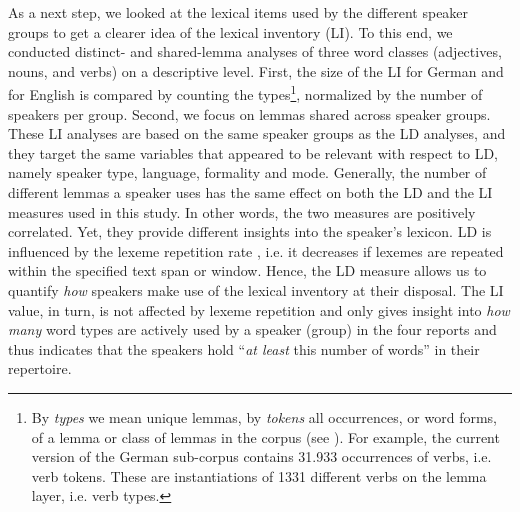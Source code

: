 \documentclass[output=paper,colorlinks,citecolor=brown]{langscibook}
\begin{document}
As a next step, we looked at the lexical items used by the different speaker groups to get a clearer idea of the lexical inventory (LI). To this end, we conducted distinct- and shared-lemma analyses of three word classes (adjectives, nouns, and verbs) on a descriptive level. First, the size of the LI for German and for English is compared by counting the types\footnote{By \textit{types} we mean unique lemmas, by \textit{tokens} all occurrences, or word forms, of a lemma or class of lemmas in the corpus (see \citealt[10]{PustejovskyBatiukova2019Lexicon}). For example, the current version of the German sub-corpus contains 31.933 occurrences of verbs, i.e. verb tokens. These are instantiations of 1331 different verbs on the lemma layer, i.e. verb types.}, normalized by the number of speakers per group. Second, we focus on lemmas shared across speaker groups. These LI analyses are based on the same speaker groups as the LD analyses, and they target the same variables that appeared to be relevant with respect to LD, namely speaker type, language, formality and mode. Generally, the number of different lemmas a speaker uses has the same effect on both the LD and the LI measures used in this study. In other words, the two measures are positively correlated. Yet, they provide different insights into the speaker’s lexicon. LD is influenced by the lexeme repetition rate \citep[87]{Jarvis2013DiversityinLD}, i.e. it decreases if lexemes are repeated within the specified text span or window. Hence, the LD measure allows us to quantify \textit{how} speakers make use of the lexical inventory at their disposal. The LI value, in turn, is not affected by lexeme repetition and only gives insight into \textit{how many} word types are actively used by a speaker (group) in the four reports and thus indicates that the speakers hold ``\textit{at least} this number of words'' \citep[358]{NationAnthony2016VocabSize} in their repertoire.
\end{document}
